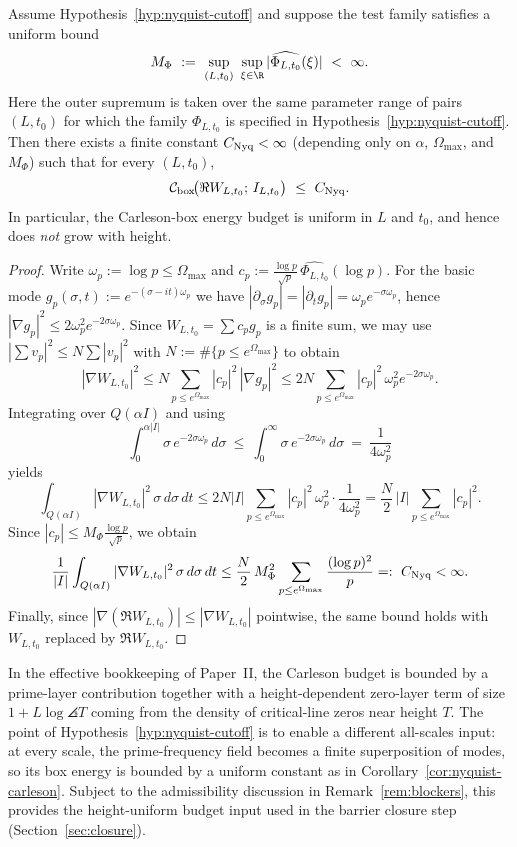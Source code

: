 \documentclass[11pt]{article}
\begin{document}
\begin{corollary}\label{cor:nyquist-carleson}
Assume Hypothesis~\ref{hyp:nyquist-cutoff} and suppose the test family satisfies a uniform bound
\[
  M_\Phi\ :=\ \sup_{(L,t_0)}\ \sup_{\xi\in\R}|\widehat{\Phi_{L,t_0}}(\xi)|\ <\ \infty.
\]
Here the outer supremum is taken over the same parameter range of pairs $(L,t_0)$ for which the family $\Phi_{L,t_0}$ is specified in Hypothesis~\ref{hyp:nyquist-cutoff}.
Then there exists a finite constant $C_{\rm Nyq}<\infty$ (depending only on $\alpha$, $\Omega_{\max}$, and $M_\Phi$) such that for every $(L,t_0)$,
\[
  \mathcal C_{\rm box}\!\big(\Re W_{L,t_0};\,I_{L,t_0}\big)\ \le\ C_{\rm Nyq}.
\]
In particular, the Carleson-box energy budget is uniform in $L$ and $t_0$, and hence does \emph{not} grow with height.
\end{corollary}
\begin{proof}
Write $\omega_p:=\log p\le \Omega_{\max}$ and $c_p:=\frac{\log p}{\sqrt{p}}\,\widehat{\Phi_{L,t_0}}(\log p)$.
For the basic mode $g_p(\sigma,t):=e^{-(\sigma-i t)\omega_p}$ we have
$|\partial_\sigma g_p|=|\partial_t g_p|=\omega_p e^{-\sigma\omega_p}$, hence
$
|\nabla g_p|^2 \le 2\omega_p^2 e^{-2\sigma\omega_p}.
$
Since $W_{L,t_0}=\sum c_p g_p$ is a finite sum, we may use $|\sum v_p|^2\le N\sum |v_p|^2$ with $N:=\#\{p\le e^{\Omega_{\max}}\}$ to obtain
\[
  |\nabla W_{L,t_0}|^2
  \le
  N\sum_{p\le e^{\Omega_{\max}}}|c_p|^2\,|\nabla g_p|^2
  \le
  2N\sum_{p\le e^{\Omega_{\max}}}|c_p|^2\,\omega_p^2 e^{-2\sigma\omega_p}.
\]
Integrating over $Q(\alpha I)$ and using
\[
  \int_0^{\alpha|I|} \sigma\,e^{-2\sigma\omega_p}\,d\sigma\ \le\ \int_0^{\infty}\sigma\,e^{-2\sigma\omega_p}\,d\sigma\ =\ \frac{1}{4\omega_p^2}
\]
yields
\[
  \int_{Q(\alpha I)}|\nabla W_{L,t_0}|^2\,\sigma\,d\sigma\,dt
  \le
  2N|I|\sum_{p\le e^{\Omega_{\max}}}|c_p|^2\,\omega_p^2\cdot \frac{1}{4\omega_p^2}
  =
  \frac{N}{2}\,|I|\sum_{p\le e^{\Omega_{\max}}}|c_p|^2.
\]
Since $|c_p|\le M_\Phi\frac{\log p}{\sqrt{p}}$, we obtain
\[
  \frac{1}{|I|}\int_{Q(\alpha I)}|\nabla W_{L,t_0}|^2\,\sigma\,d\sigma\,dt
  \le
  \frac{N}{2}\,M_\Phi^2\sum_{p\le e^{\Omega_{\max}}}\frac{(\log p)^2}{p}
  =:\ C_{\rm Nyq}<\infty.
\]
Finally, since $|\nabla(\Re W_{L,t_0})|\le |\nabla W_{L,t_0}|$ pointwise, the same bound holds with $W_{L,t_0}$ replaced by $\Re W_{L,t_0}$.
\end{proof}

\begin{remark}\label{rem:carleson-gap}
In the effective bookkeeping of Paper~II, the Carleson budget is bounded by a prime-layer contribution together with a height-dependent zero-layer term of size $1+L\log\angles{T}$ coming from the density of critical-line zeros near height $T$.
The point of Hypothesis~\ref{hyp:nyquist-cutoff} is to enable a different all-scales input: at every scale, the prime-frequency field becomes a finite superposition of modes, so its box energy is bounded by a uniform constant as in Corollary~\ref{cor:nyquist-carleson}.
Subject to the admissibility discussion in Remark~\ref{rem:blockers}, this provides the height-uniform budget input used in the barrier closure step (Section~\ref{sec:closure}).
\end{remark}
\end{document}
